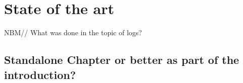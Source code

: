 \chapter{State of the art}
\label{chap:soa}
\minitoc

NBM//
What was done in the topic of logs?

\section{Standalone Chapter or better as part of the introduction?}











